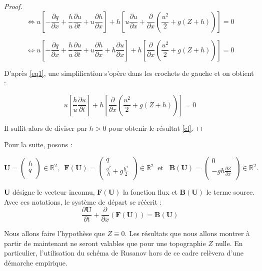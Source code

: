 \documentclass[
11pt, %
francais, %
singlespacing, %
headsepline, %
]{MastersDoctoralThesis} %
\theoremstyle{definition}
\begin{document}
\begin{proof}
$$
\Leftrightarrow u\left[-\frac{\partial q}{\partial x}+\frac{h}{u}\frac{\partial u}{\partial t}+u\frac{\partial h }{\partial x}\right]+h\left[u \frac{\partial u}{\partial x}+\frac{\partial}{\partial x}(\frac{u^{2}}{2}+g(Z+h))\right] =0
$$

$$
\Leftrightarrow u\left[-\frac{\partial q}{\partial x}+\frac{h}{u}\frac{\partial u}{\partial t}+u\frac{\partial h }{\partial x} + h\frac{\partial u }{\partial x}\right]+h\left[\frac{\partial}{\partial x}(\frac{u^{2}}{2}+g(Z+h))\right] =0
$$


D'après \eqref{eq1}, une simplification s'opère dans les crochets de gauche et on obtient :

$$
u\left[\frac{h}{u}\frac{\partial u}{\partial t}\right]+h\left[\frac{\partial}{\partial x}(\frac{u^{2}}{2}+g(Z+h))\right] =0
$$

Il suffit alors de diviser par $h>0$ pour obtenir le résultat \eqref{cl}.

\end{proof}

Pour la suite, posons :

\begin{center}

$\textbf{U}=\begin{pmatrix}
   h \\
    q \\
\end{pmatrix}\in\mathbb{R}^{2},  \phantom{..} \textbf{F} (\textbf{U}) =\begin{pmatrix}
   q \\
   \frac{q^{2}}{h}+g\frac{h^{2}}{2} \\
\end{pmatrix}\in\mathbb{R}^{2} \phantom{..} \text{et} \phantom{...} \textbf{B} (\textbf{U}) =\begin{pmatrix}
   0 \\
   -gh \frac{\partial Z}{\partial x}\\
\end{pmatrix}\in\mathbb{R}^{2}.
$
\end{center}

$\textbf{U}$ désigne le vecteur inconnu, $\textbf{F} (\textbf{U})$ la fonction flux et $\textbf{B} (\textbf{U})$ le terme source. Avec ces notations,
le système de départ se réécrit : $$\frac{\partial\textbf{U}}{\partial t}+\frac{\partial}{\partial x}(\textbf{F} (\textbf{U})) = \textbf{B} (\textbf{U})$$

Nous allons faire l'hypothèse que $Z \equiv 0$. Les résultats que nous allons montrer à partir de maintenant ne seront valables que pour une topographie $Z$ nulle.
En particulier, l'utilisation du schéma de Rusanov hors de ce cadre relèvera d'une démarche empirique.
\end{document}
